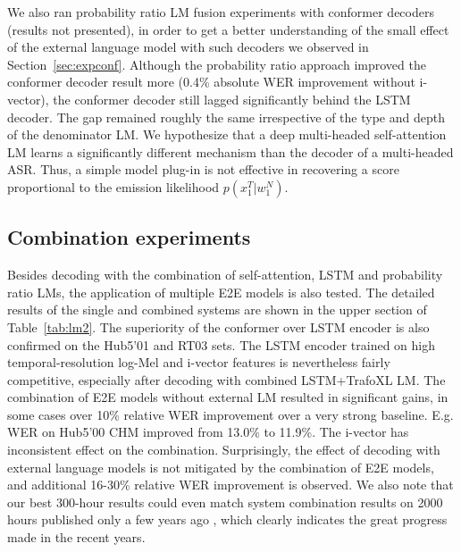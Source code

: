 \documentclass[a4paper]{article}
\begin{document}
We also ran probability ratio LM fusion experiments with conformer decoders (results not presented), in order to get a better understanding of  the small effect of the external language model with such decoders we observed in Section~\ref{sec:expconf}.
Although the probability ratio approach improved the conformer decoder result more (0.4\% absolute WER improvement without i-vector), the conformer decoder still lagged significantly behind the LSTM decoder.
The gap remained roughly the same irrespective of the type and depth of the denominator LM.
We hypothesize that a deep multi-headed self-attention LM learns a significantly different mechanism than the decoder of a multi-headed ASR.
Thus, a simple model plug-in is not effective in recovering a score proportional to the emission likelihood $p(x_1^T|w_1^N)$.

\vspace{-1.5mm}
\subsection{Combination experiments}
\vspace{-1mm}
Besides decoding with the combination of self-attention, LSTM and probability ratio LMs, the application of multiple E2E models is also tested.
The detailed results of the single and combined systems are shown in the upper section of Table~\ref{tab:lm2}.
The superiority of the conformer over LSTM encoder is also confirmed on the Hub5'01 and RT03 sets.
The LSTM encoder trained on high temporal-resolution log-Mel and i-vector features is nevertheless fairly competitive, especially after decoding with combined LSTM+TrafoXL LM.
The combination of E2E models without external LM resulted in significant gains, in some cases over 10\% relative WER improvement over a very strong baseline.
E.g. WER on Hub5'00 CHM improved from 13.0\% to 11.9\%.
The i-vector has inconsistent effect on the combination.
Surprisingly, the effect of decoding with external language models is not mitigated by the combination of E2E models, and additional 16-30\% relative WER improvement is observed.
We also note that our best 300-hour results could even match system combination results on 2000 hours published only a few years ago \cite{capio}, which clearly indicates the great progress made in the recent years.


\vspace{-2mm}
\end{document}
